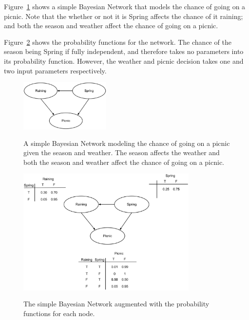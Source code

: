 \documentclass[12pt]{ucthesis}
\newcommand{\captionfonts}{\small\bf\ssp}
\begin{document}
Figure~\ref{fig:bayesNet1} shows a simple Bayesian Network that models the chance of going on a picnic.
Note that the whether or not it is Spring affects the chance of it raining; and both the season and weather
affect the chance of going on a picnic.

Figure~\ref{fig:bayesNet2} shows the probability functions for the network. The chance of the season being Spring if
fully independent, and therefore takes no parameters into its probability function. However, the weather and picnic decision
takes one and two input parameters respectively.

\begin{figure}
   \begin{center}
      \includegraphics[width=0.4\textwidth]{images/Bayes_Net_1.eps}
      \captionfonts
      \caption[Simple Bayes Net]{A simple Bayesian Network modeling the chance of going on a picnic given the season and weather. The season affects the weather and both the season and weather affect the chance of going on a picnic.}
      \label{fig:bayesNet1}
   \end{center}
\end{figure}

\begin{figure}
   \begin{center}
      \includegraphics[width=0.8\textwidth]{images/Bayes_Net_2.eps}
      \captionfonts
      \caption[Bayes Net With Probabilities]{The simple Bayesian Network augmented with the probability functions for each node.}
      \label{fig:bayesNet2}
   \end{center}
\end{figure}
\end{document}
